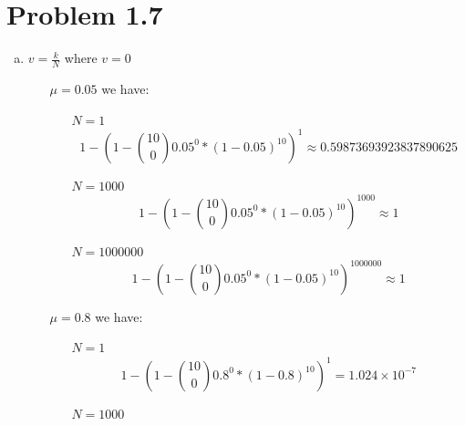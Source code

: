 \documentclass{article}
\def\math#1{$#1$}
\begin{document}
\section{Problem 1.7}
\begin{enumerate}[a)]
    \item \math{v = \frac{k}{N}} where \math{v = 0}
        \begin{itemize}
            \item [\math{\mu = 0.05}] we have:
                \begin{itemize}
                \item [\math{N = 1}] 
                    \begin{equation}
                        1 - (1 - {10 \choose 0} 0.05^0 * (1 - 0.05)^{10})^1 \approx 0.59873693923837890625
                    \end{equation}
                \item [\math{N = 1000}]
                     \begin{equation}
                        1 - (1 - {10 \choose 0} 0.05^0 * (1 - 0.05)^{10})^{1000} \approx 1
                    \end{equation}
                \item [\math{N = 1000000}]
                     \begin{equation}
                        1 - (1 - {10 \choose 0} 0.05^0 * (1 - 0.05)^{10})^{1000000} \approx 1
                    \end{equation}
                \end{itemize}
            \item [\math{\mu = 0.8}] we have:
                \begin{itemize}
                \item [\math{N = 1}] 
                    \begin{equation}
                        1 - (1 - {10 \choose 0} 0.8^0 * (1 - 0.8)^{10})^1 = 1.024 \times 10^{-7}
                    \end{equation}
                \item [\math{N = 1000}]

\end{itemize}
\end{itemize}
\end{enumerate}
\end{document}
